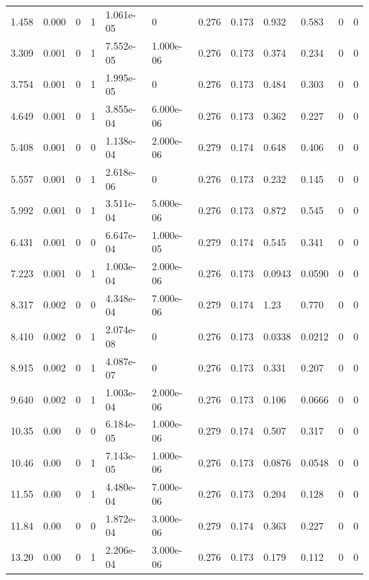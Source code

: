 \documentclass[preview]{standalone}
\begin{document}
{{\begin{tabular}{L{1.2cm}C{1.2cm} C{0.3cm}C{0.5cm} C{1.4cm}C{1.4cm} C{1.4cm}C{1.4cm} C{1.6cm}C{1.6cm} C{1.6cm}C{1.6cm}}
  1.458  &  0.000  & 0     &  1 &  1.061e-05  & 0  &  0.276&   0.173& 0.932 & 0.583   &  0 & 0  \\ 
  3.309  &  0.001  & 0     &  1 &  7.552e-05  & 1.000e-06  &  0.276&   0.173& 0.374 & 0.234   &  0 & 0  \\ 
  3.754  &  0.001  & 0     &  1 &  1.995e-05  & 0  &  0.276&   0.173& 0.484 & 0.303   &  0 & 0  \\ 
  4.649  &  0.001  & 0     &  1 &  3.855e-04  & 6.000e-06  &  0.276&   0.173& 0.362 & 0.227   &  0 & 0  \\ 
  5.408  &  0.001  & 0     &  0 &  1.138e-04  & 2.000e-06  &  0.279&   0.174& 0.648 & 0.406   &  0 & 0  \\ 
  5.557  &  0.001  & 0     &  1 &  2.618e-06  & 0  &  0.276&   0.173& 0.232 & 0.145   &  0 & 0  \\ 
  5.992  &  0.001  & 0     &  1 &  3.511e-04  & 5.000e-06  &  0.276&   0.173& 0.872 & 0.545   &  0 & 0  \\ 
  6.431  &  0.001  & 0     &  0 &  6.647e-04  & 1.000e-05  &  0.279&   0.174& 0.545 & 0.341   &  0 & 0  \\ 
  7.223  &  0.001  & 0     &  1 &  1.003e-04  & 2.000e-06  &  0.276&   0.173& 0.0943 & 0.0590   &  0 & 0  \\ 
  8.317  &  0.002  & 0     &  0 &  4.348e-04  & 7.000e-06  &  0.279&   0.174& 1.23 & 0.770   &  0 & 0  \\ 
  8.410  &  0.002  & 0     &  1 &  2.074e-08  & 0  &  0.276&   0.173& 0.0338 & 0.0212   &  0 & 0  \\ 
  8.915  &  0.002  & 0     &  1 &  4.087e-07  & 0  &  0.276&   0.173& 0.331 & 0.207   &  0 & 0  \\ 
  9.640  &  0.002  & 0     &  1 &  1.003e-04  & 2.000e-06  &  0.276&   0.173& 0.106 & 0.0666   &  0 & 0  \\ 
  10.35  &  0.00  & 0     &  0 &  6.184e-05  & 1.000e-06  &  0.279&   0.174& 0.507 & 0.317   &  0 & 0  \\ 
  10.46  &  0.00  & 0     &  1 &  7.143e-05  & 1.000e-06  &  0.276&   0.173& 0.0876 & 0.0548   &  0 & 0  \\ 
  11.55  &  0.00  & 0     &  1 &  4.480e-04  & 7.000e-06  &  0.276&   0.173& 0.204 & 0.128   &  0 & 0  \\ 
  11.84  &  0.00  & 0     &  0 &  1.872e-04  & 3.000e-06  &  0.279&   0.174& 0.363 & 0.227   &  0 & 0  \\ 
  13.20  &  0.00  & 0     &  1 &  2.206e-04  & 3.000e-06  &  0.276&   0.173& 0.179 & 0.112   &  0 & 0  \\ 

\end{tabular}}}
\end{document}
